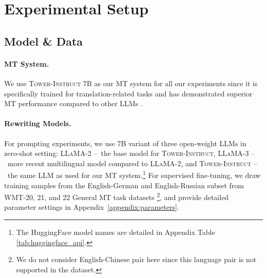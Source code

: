 \section{Experimental Setup}





\subsection{Model \& Data}

\paragraph{MT System.} We use \textsc{Tower-Instruct} 7B as our MT system for all our experiments since it is specifically trained for translation-related tasks and has demonstrated superior MT performance compared to other LLMs \citep{alves2024tower}.

\paragraph{Rewriting Models.} For prompting experiments, we use 7B variant of three open-weight LLMs in zero-shot setting: \textsc{LLaMA-2} \citep{touvron2023llama} \---\ the base model for \textsc{Tower-Instruct}, \textsc{LLaMA-3} \citep{grattafiori2024llama3herdmodels} \---\ more recent multilingual model compared to \textsc{LLaMA-2}, and \textsc{Tower-Instruct} \citep{alves2024tower} \---\ the same LLM as used for our MT system.\footnote{The HuggingFace model names are detailed in Appendix Table \ref{tab:huggingface_api}.} For supervised fine-tuning, we draw training samples from the English-German and English-Russian subset from WMT-20, 21, and 22 General MT task datasets \citep{freitag2021experts}\footnote{We do not consider English-Chinese pair here since this language pair is not supported in the dataset.}, and provide detailed parameter settings in Appendix~\ref{appendix:parameters}.





